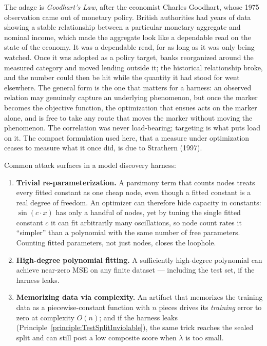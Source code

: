 The adage is \emph{Goodhart's Law}, after the economist Charles Goodhart, whose 1975 observation came out of monetary policy.
British authorities had years of data showing a stable relationship between a particular monetary aggregate and nominal income, which made the aggregate look like a dependable read on the state of the economy.
It was a dependable read, for as long as it was only being watched.
Once it was adopted as a policy target, banks reorganized around the measured category and moved lending outside it; the historical relationship broke, and the number could then be hit while the quantity it had stood for went elsewhere.
The general form is the one that matters for a harness: an observed relation may genuinely capture an underlying phenomenon, but once the marker becomes the objective function, the optimization that ensues acts on the marker alone, and is free to take any route that moves the marker without moving the phenomenon.
The correlation was never load-bearing; targeting is what puts load on it.
The compact formulation used here, that a measure under optimization ceases to measure what it once did, is due to Strathern (1997).

Common attack surfaces in a model discovery harness:
\begin{enumerate}
\item \textbf{Trivial re-parameterization.} A parsimony term that counts nodes treats every fitted constant as one cheap node, even though a fitted constant is a real degree of freedom.
An optimizer can therefore hide capacity in constants: $\sin(c \cdot x)$ has only a handful of nodes, yet by tuning the single fitted constant $c$ it can fit arbitrarily many oscillations, so node count rates it ``simpler'' than a polynomial with the same number of free parameters.
Counting fitted parameters, not just nodes, closes the loophole.
\item \textbf{High-degree polynomial fitting.} A sufficiently high-degree polynomial can achieve near-zero MSE on any finite dataset — including the test set, if the harness leaks.
\item \textbf{Memorizing data via complexity.} An artifact that memorizes the training data as a piecewise-constant function with $n$ pieces drives its \emph{training} error to zero at complexity $O(n)$; and if the harness leaks (Principle~\ref{principle:TestSplitInviolable}), the same trick reaches the sealed split and can still post a low composite score when $\lambda$ is too small.
\end{enumerate}

